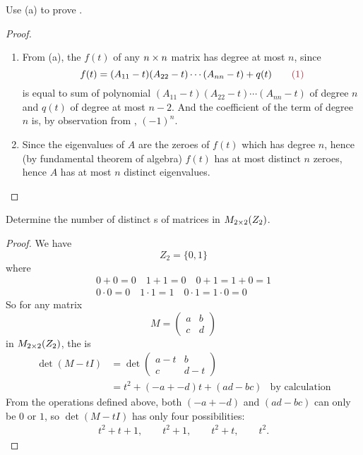 \begin{exercise} \label{exercise 5.1.24}
Use (a) to prove .
\end{exercise}

\begin{proof} \ 

\begin{enumerate}
\item 
From (a), the \CPOLY{} \(f(t)\) of any \(n \times n\) matrix has degree at most \(n\), since
\[
    f(t) = (A_{11} - t)(A_{22} - t) \cdots (A_{nn} - t) + q(t) \quad \quad \MAROON{(1)}
\]
is equal to sum of polynomial \((A_{11} - t)(A_{22} - t) \cdots (A_{nn} - t)\) of degree \(n\) and \(q(t)\) of degree at most \(n - 2\).
And the coefficient of the term of degree \(n\) is, by observation from , \((-1)^{n}\).

\item
Since the eigenvalues of \(A\) are the zeroes of \(f(t)\) which has degree \(n\), hence (by fundamental theorem of algebra) \(f(t)\) has at most distinct \(n\) zeroes, hence \(A\) has at most \(n\) distinct eigenvalues.
\end{enumerate}
\end{proof}

\begin{exercise} \label{exercise 5.1.25}
Determine the number of distinct \CPOLY{}s of matrices in \(M_{2 \times 2}(Z_2)\).
\end{exercise}

\begin{proof}
We have
\[
    Z_2 = \{ 0 , 1\}
\]
where
\[
    \begin{array}{r}
        0+0=0 \quad 1+1=0 \quad 0+1=1+0=1 \\
        0 \cdot 0=0 \quad 1 \cdot 1=1 \quad 0 \cdot 1=1 \cdot 0=0
    \end{array}
\]
So for any matrix
\[
    M = \begin{pmatrix} a & b \\ c & d \end{pmatrix}
\]
in \(M_{2 \times 2}(Z_2)\), the \CPOLY{} is
\begin{align*}
    \det(M - tI) & = \det \begin{pmatrix} a - t & b \\ c & d - t \end{pmatrix} \\
        & = t^2 + (-a + -d) t + (ad - bc) & \text{by calculation}
\end{align*}
From the operations defined above, both \((-a + -d)\) and \((ad - bc)\) can only be \(0\) or \(1\), so \(\det(M - tI)\) has only four possibilities:
\begin{align*}
    t^2 + t + 1, \quad \quad t^2 + 1, \quad \quad t^2 + t, \quad \quad t^2.
\end{align*}
\end{proof}
